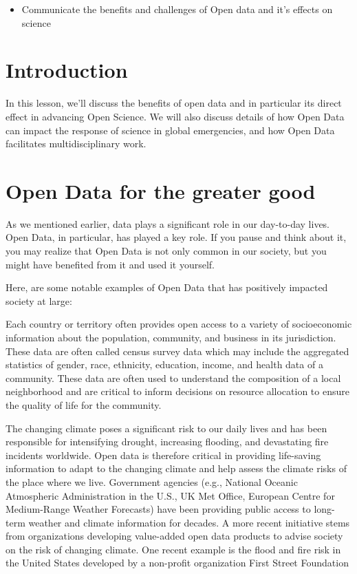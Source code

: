 \documentclass[
  letterpaper,
  DIV=11,
  numbers=noendperiod]{scrreport}
\providecommand{\tightlist}{%
  \setlength{\itemsep}{0pt}\setlength{\parskip}{0pt}}\usepackage{longtable,booktabs,array}
\begin{document}
\begin{itemize}
\tightlist
\item
  Communicate the benefits and challenges of Open data and it's effects
  on science
\end{itemize}

\hypertarget{introduction-11}{%
\section{Introduction}\label{introduction-11}}

In this lesson, we'll discuss the benefits of open data and in
particular its direct effect in advancing Open Science. We will also
discuss details of how Open Data can impact the response of science in
global emergencies, and how Open Data facilitates multidisciplinary
work.

\hypertarget{open-data-for-the-greater-good}{%
\section{Open Data for the greater
good}\label{open-data-for-the-greater-good}}

As we mentioned earlier, data plays a significant role in our day-to-day
lives. Open Data, in particular, has played a key role. If you pause and
think about it, you may realize that Open Data is not only common in our
society, but you might have benefited from it and used it yourself.

Here, are some notable examples of Open Data that has positively
impacted society at large:

Each country or territory often provides open access to a variety of
socioeconomic information about the population, community, and business
in its jurisdiction. These data are often called census survey data
which may include the aggregated statistics of gender, race, ethnicity,
education, income, and health data of a community. These data are often
used to understand the composition of a local neighborhood and are
critical to inform decisions on resource allocation to ensure the
quality of life for the community.

The changing climate poses a significant risk to our daily lives and has
been responsible for intensifying drought, increasing flooding, and
devastating fire incidents worldwide. Open data is therefore critical in
providing life-saving information to adapt to the changing climate and
help assess the climate risks of the place where we live. Government
agencies (e.g., National Oceanic Atmospheric Administration in the U.S.,
UK Met Office, European Centre for Medium-Range Weather Forecasts) have
been providing public access to long-term weather and climate
information for decades. A more recent initiative stems from
organizations developing value-added open data products to advise
society on the risk of changing climate. One recent example is the flood
and fire risk in the United States developed by a non-profit
organization First Street Foundation
\end{document}
